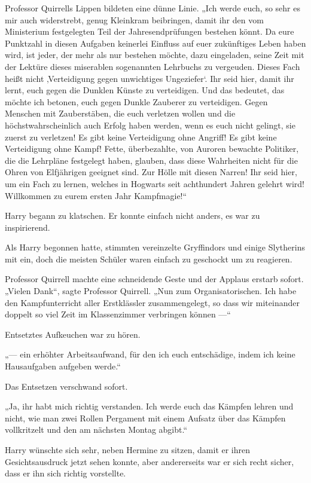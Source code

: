 {Professor Quirrells Lippen bildeten eine dünne Linie. „Ich werde euch, so sehr es mir auch widerstrebt, genug Kleinkram beibringen, damit ihr den vom Ministerium festgelegten Teil der Jahresendprüfungen bestehen könnt. Da eure Punktzahl in diesen Aufgaben keinerlei Einfluss auf euer zukünftiges Leben haben wird, ist jeder, der mehr als nur bestehen möchte, dazu eingeladen, seine Zeit mit der Lektüre dieses miserablen sogenannten Lehrbuchs zu vergeuden. Dieses Fach heißt nicht ‚Verteidigung gegen unwichtiges Ungeziefer`. Ihr seid hier, damit ihr lernt, euch gegen die Dunklen Künste zu verteidigen. Und das bedeutet, das möchte ich betonen, euch gegen Dunkle Zauberer zu verteidigen. Gegen Menschen mit Zauberstäben, die euch verletzen wollen und die höchstwahrscheinlich auch Erfolg haben werden, wenn es euch nicht gelingt, sie zuerst zu verletzen! Es gibt keine Verteidigung ohne Angriff! Es gibt keine Verteidigung ohne Kampf! Fette, überbezahlte, von Auroren bewachte Politiker, die die Lehrpläne festgelegt haben, glauben, dass diese Wahrheiten nicht für die Ohren von Elfjährigen geeignet sind. Zur Hölle mit diesen Narren! Ihr seid hier, um ein Fach zu lernen, welches in Hogwarts seit achthundert Jahren gelehrt wird! Willkommen zu eurem ersten Jahr Kampfmagie!“

Harry begann zu klatschen. Er konnte einfach nicht anders, es war zu inspirierend.

Als Harry begonnen hatte, stimmten vereinzelte Gryffindors und einige Slytherins mit ein, doch die meisten Schüler waren einfach zu geschockt um zu reagieren.

Professor Quirrell machte eine schneidende Geste und der Applaus erstarb sofort. „Vielen Dank“, sagte Professor Quirrell. „Nun zum Organisatorischen. Ich habe den Kampfunterricht aller Erstklässler zusammengelegt, so dass wir miteinander doppelt so viel Zeit im Klassenzimmer verbringen können —“

Entsetztes Aufkeuchen war zu hören.

„— ein erhöhter Arbeitsaufwand, für den ich euch entschädige, indem ich keine Hausaufgaben aufgeben werde.“

Das Entsetzen verschwand sofort.

„Ja, ihr habt mich richtig verstanden. Ich werde euch das Kämpfen lehren und nicht, wie man zwei Rollen Pergament mit einem Aufsatz über das Kämpfen vollkritzelt und den am nächsten Montag abgibt.“

Harry wünschte sich sehr, neben Hermine zu sitzen, damit er ihren Gesichtsausdruck jetzt sehen konnte, aber andererseits war er sich recht sicher, dass er ihn sich richtig vorstellte.

}
